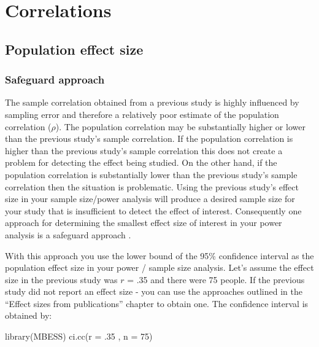 \documentclass[
]{krantz}
\makeatletter
\newenvironment{Shaded}{\begin{snugshade}}{\end{snugshade}}
\newcommand{\AttributeTok}[1]{\textcolor[rgb]{0.61,0.61,0.61}{#1}}
\newcommand{\DecValTok}[1]{\textcolor[rgb]{0.06,0.06,0.06}{#1}}
\newcommand{\FunctionTok}[1]{\textcolor[rgb]{0,0,0}{#1}}
\newcommand{\NormalTok}[1]{#1}
\newenvironment{kframe}{%
\medskip{}
\setlength{\fboxsep}{.8em}
 \def\at@end@of@kframe{}%
 \ifinner\ifhmode%
  \def\at@end@of@kframe{\end{minipage}}%
  \begin{minipage}{\columnwidth}%
 \fi\fi%
 \def\FrameCommand##1{\hskip\@totalleftmargin \hskip-\fboxsep
 \colorbox{shadecolor}{##1}\hskip-\fboxsep
     \hskip-\linewidth \hskip-\@totalleftmargin \hskip\columnwidth}%
 \MakeFramed {\advance\hsize-\width
   \@totalleftmargin\z@ \linewidth\hsize
   \@setminipage}}%
 {\par\unskip\endMakeFramed%
 \at@end@of@kframe}
\renewenvironment{Shaded}{\begin{kframe}}{\end{kframe}}
\makeatother
\begin{document}
\hypertarget{correlations}{%
\section{Correlations}\label{correlations}}

\hypertarget{population-effect-size-2}{%
\subsection{Population effect size}\label{population-effect-size-2}}

\hypertarget{safeguard-approach-2}{%
\subsubsection{Safeguard approach}\label{safeguard-approach-2}}

The sample correlation obtained from a previous study is highly influenced by sampling error and therefore a relatively poor estimate of the population correlation (\(\rho\)). The population correlation may be substantially higher or lower than the previous study's sample correlation. If the population correlation is higher than the previous study's sample correlation this does not create a problem for detecting the effect being studied. On the other hand, if the population correlation is substantially lower than the previous study's sample correlation then the situation is problematic. Using the previous study's effect size in your sample size/power analysis will produce a desired sample size for your study that is insufficient to detect the effect of interest. Consequently one approach for determining the smallest effect size of interest in your power analysis is a safeguard approach \citep{perugini2014safeguard}.

With this approach you use the lower bound of the 95\% confidence interval as the population effect size in your power / sample size analysis. Let's assume the effect size in the previous study was \(r\) = .35 and there were 75 people. If the previous study did not report an effect size - you can use the approaches outlined in the ``Effect sizes from publications'' chapter to obtain one. The confidence interval is obtained by:

\begin{Shaded}
\begin{Highlighting}[]
\FunctionTok{library}\NormalTok{(MBESS)}
\FunctionTok{ci.cc}\NormalTok{(}\AttributeTok{r =}\NormalTok{ .}\DecValTok{35}\NormalTok{ , }\AttributeTok{n =} \DecValTok{75}\NormalTok{) }
\end{Highlighting}
\end{Shaded}
\end{document}
